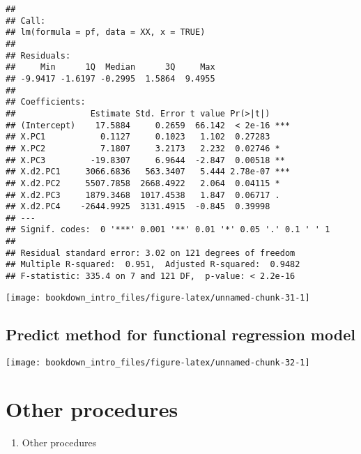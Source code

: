 \documentclass[
]{book}
\providecommand{\tightlist}{%
  \setlength{\itemsep}{0pt}\setlength{\parskip}{0pt}}
\begin{document}
\begin{verbatim}
## 
## Call:
## lm(formula = pf, data = XX, x = TRUE)
## 
## Residuals:
##     Min      1Q  Median      3Q     Max 
## -9.9417 -1.6197 -0.2995  1.5864  9.4955 
## 
## Coefficients:
##               Estimate Std. Error t value Pr(>|t|)    
## (Intercept)    17.5884     0.2659  66.142  < 2e-16 ***
## X.PC1           0.1127     0.1023   1.102  0.27283    
## X.PC2           7.1807     3.2173   2.232  0.02746 *  
## X.PC3         -19.8307     6.9644  -2.847  0.00518 ** 
## X.d2.PC1     3066.6836   563.3407   5.444 2.78e-07 ***
## X.d2.PC2     5507.7858  2668.4922   2.064  0.04115 *  
## X.d2.PC3     1879.3468  1017.4538   1.847  0.06717 .  
## X.d2.PC4    -2644.9925  3131.4915  -0.845  0.39998    
## ---
## Signif. codes:  0 '***' 0.001 '**' 0.01 '*' 0.05 '.' 0.1 ' ' 1
## 
## Residual standard error: 3.02 on 121 degrees of freedom
## Multiple R-squared:  0.951,  Adjusted R-squared:  0.9482 
## F-statistic: 335.4 on 7 and 121 DF,  p-value: < 2.2e-16
\end{verbatim}

\begin{center}\texttt{[image: bookdown\_intro\_files/figure-latex/unnamed-chunk-31-1]} \end{center}

\hypertarget{predict-method-for-functional-regression-model}{%
\subsection{Predict method for functional regression model}\label{predict-method-for-functional-regression-model}}

\begin{center}\texttt{[image: bookdown\_intro\_files/figure-latex/unnamed-chunk-32-1]} \end{center}

\hypertarget{other-procedures}{%
\section{Other procedures}\label{other-procedures}}

\begin{enumerate}
\def\labelenumi{\arabic{enumi}.}
\setcounter{enumi}{3}
\tightlist
\item
  Other procedures
\end{enumerate}
\end{document}
